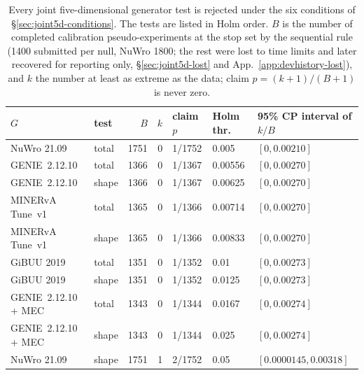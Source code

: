 \begin{table}[htbp]
  \caption[Joint generator-test decisions]{Every joint five-dimensional generator test is rejected under the six conditions of \S\ref{sec:joint5d-conditions}. The tests are listed in Holm order. $B$ is the number of completed calibration pseudo-experiments at the stop set by the sequential rule (1400 submitted per null, NuWro 1800; the rest were lost to time limits and later recovered for reporting only, \S\ref{sec:joint5d-lost} and App.~\ref{app:devhistory-lost}), and $k$ the number at least as extreme as the data; claim $p=(k+1)/(B+1)$ is never zero.}
  \label{tab:joint5d}
  \centering
  \small
  \begin{tabular}{@{}llrrlll@{}}
    \toprule
    $G$ & test & $B$ & $k$ & claim $p$ & Holm thr. & 95\% CP interval of $k/B$ \\
    \midrule
    NuWro 21.09 & total & 1751 & 0 & 1/1752 & 0.005 & $[0, 0.00210]$ \\
    GENIE~2.12.10 & total & 1366 & 0 & 1/1367 & 0.00556 & $[0, 0.00270]$ \\
    GENIE~2.12.10 & shape & 1366 & 0 & 1/1367 & 0.00625 & $[0, 0.00270]$ \\
    MINERvA Tune~v1 & total & 1365 & 0 & 1/1366 & 0.00714 & $[0, 0.00270]$ \\
    MINERvA Tune~v1 & shape & 1365 & 0 & 1/1366 & 0.00833 & $[0, 0.00270]$ \\
    GiBUU 2019 & total & 1351 & 0 & 1/1352 & 0.01 & $[0, 0.00273]$ \\
    GiBUU 2019 & shape & 1351 & 0 & 1/1352 & 0.0125 & $[0, 0.00273]$ \\
    GENIE~2.12.10 + MEC & total & 1343 & 0 & 1/1344 & 0.0167 & $[0, 0.00274]$ \\
    GENIE~2.12.10 + MEC & shape & 1343 & 0 & 1/1344 & 0.025 & $[0, 0.00274]$ \\
    NuWro 21.09 & shape & 1751 & 1 & 2/1752 & 0.05 & $[0.0000145, 0.00318]$ \\
    \bottomrule
  \end{tabular}
\end{table}

